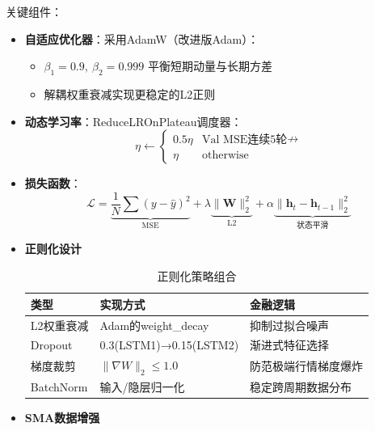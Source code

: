 \documentclass[a4paper,12pt]{ctexart}
\begin{document}
关键组件：
\begin{itemize}
\item \textbf{自适应优化器}：采用AdamW（改进版Adam）：
  \begin{itemize}
  \item $\beta_1=0.9,\ \beta_2=0.999$ 平衡短期动量与长期方差
  \item 解耦权重衰减实现更稳定的L2正则
  \end{itemize}
  
\item \textbf{动态学习率}：ReduceLROnPlateau调度器：
  \[
  \eta \leftarrow \begin{cases}
  0.5\eta & \text{Val MSE连续5轮$\nrightarrow$} \\
  \eta & \text{otherwise}
  \end{cases}
  \]
  
\item \textbf{损失函数}：
  \[
  \mathcal{L} = \underbrace{\frac{1}{N}\sum(y-\hat{y})^2}_{\text{MSE}} + \lambda \underbrace{\|\mathbf{W}\|_2^2}_{\text{L2}} + \alpha \underbrace{\|\mathbf{h}_t-\mathbf{h}_{t-1}\|_2^2}_{\text{状态平滑}}
  \]

\item \textbf{正则化设计}
    \begin{table}[h]
    \centering
    \caption{正则化策略组合}
    \begin{tabular}{lll}
    \toprule
    类型 & 实现方式 & 金融逻辑 \\
    \midrule
    L2权重衰减 & Adam的weight\_decay & 抑制过拟合噪声 \\
    Dropout & 0.3(LSTM1)→0.15(LSTM2) & 渐进式特征选择 \\
    梯度裁剪 & $\|\nabla W\|_2 \leq 1.0$ & 防范极端行情梯度爆炸 \\
    BatchNorm & 输入/隐层归一化 & 稳定跨周期数据分布 \\
    \bottomrule
    \end{tabular}
    \end{table}

\item \textbf{SMA数据增强}
\end{itemize}
\end{document}
